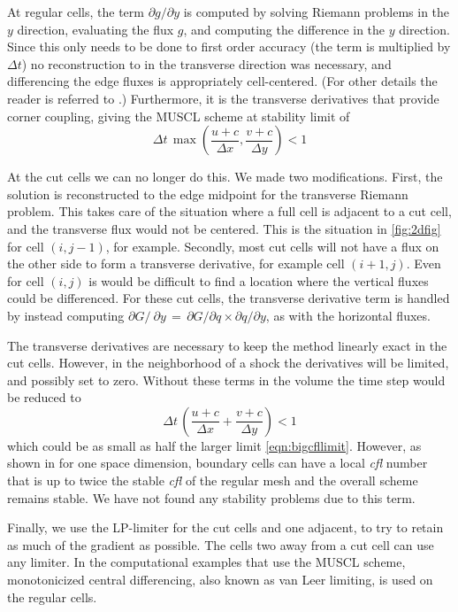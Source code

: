 At regular cells, the term $\partial g / \partial y$ is computed by solving Riemann
problems in the $y$ direction,  evaluating the flux $g$, and computing the
difference in the $y$ direction.
Since this only needs to be done to first order accuracy (the term is multiplied
by $\Delta t$)  no reconstruction to in the transverse direction was necessary,
and differencing the edge fluxes is appropriately cell-centered.
(For other details the reader is referred to \cite{Colella:Unsplit}.)
Furthermore, it is the transverse derivatives that provide corner coupling,
giving the MUSCL scheme at stability limit of
\begin{equation}
\label{eqn:bigcfllimit}
\Delta t \, \max \left (\frac{u+c}{\Delta x} , \frac{v+c}{\Delta y} \right) < 1
\end{equation}

At the cut cells we can no longer do this.  We made two modifications. First,
the solution is reconstructed to the edge midpoint  for the transverse Riemann problem.
This takes care of the situation where a full cell is adjacent to a cut cell, and
the transverse flux would not be centered. This is the situation
in \ref{fig:2dfig} for cell $(i,j-1)$, for example.
Secondly, most cut cells will not have a flux on the other side to form a
transverse derivative, for example cell $(i+1,j)$. Even for cell $(i,j)$ is would
be difficult to find a location where the vertical fluxes could be differenced.
For these cut cells, the transverse derivative term is handled by instead computing
$ \partial G / \ \partial y \, = \,  \partial G / \partial q \times \partial q / \partial y$,
as with the horizontal fluxes.

The transverse derivatives are necessary to keep the method linearly exact in the
cut cells. 
However, in the neighborhood of a shock the derivatives will be limited, and
possibly set to zero.
Without these terms in the volume  the time step would be reduced to 
\begin{equation}
\Delta t \, \left (\frac{u+c}{\Delta x} + \frac{v+c}{\Delta y} \right) < 1
\end{equation}
which could be as small as half the larger limit \eqref{eqn:bigcfllimit}.
However, as shown in \cite{mjb:stability2} for one space dimension, 
boundary cells can have
a local {\em cfl} number that is up to twice the stable {\em cfl} of the regular
mesh and the overall scheme remains stable.  We have not found any stability
problems due to this term.  

Finally, we use the LP-limiter \cite{May_Berger_LP} for the cut 
cells and one adjacent, to try
to retain as much of the gradient as possible. The cells two away from a cut cell
can use any limiter. In the computational examples that use the MUSCL scheme, 
monotonicized central differencing, also known as van Leer limiting,  
is used on the regular cells.


